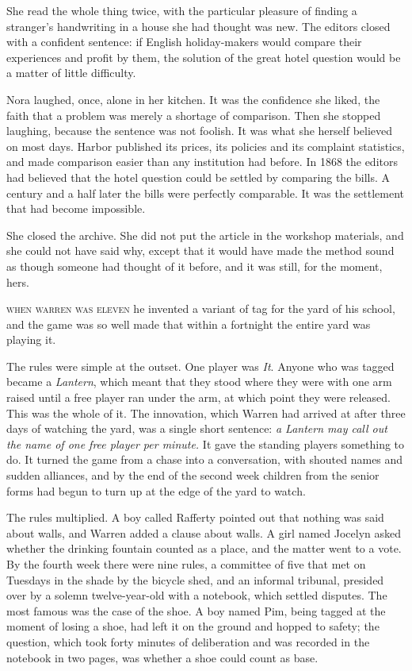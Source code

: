 She read the whole thing twice, with the particular pleasure of finding a stranger's handwriting in a house she had thought was new. The editors closed with a confident sentence: if English holiday-makers would compare their experiences and profit by them, the solution of the great hotel question would be a matter of little difficulty.

Nora laughed, once, alone in her kitchen. It was the confidence she liked, the faith that a problem was merely a shortage of comparison. Then she stopped laughing, because the sentence was not foolish. It was what she herself believed on most days. Harbor published its prices, its policies and its complaint statistics, and made comparison easier than any institution had before. In 1868 the editors had believed that the hotel question could be settled by comparing the bills. A century and a half later the bills were perfectly comparable. It was the settlement that had become impossible.

She closed the archive. She did not put the article in the workshop materials, and she could not have said why, except that it would have made the method sound as though someone had thought of it before, and it was still, for the moment, hers.


\textsc{when warren was eleven} he invented a variant of tag for the yard of his school, and the game was so well made that within a fortnight the entire yard was playing it.

The rules were simple at the outset. One player was \emph{It}. Anyone who was tagged became a \emph{Lantern}, which meant that they stood where they were with one arm raised until a free player ran under the arm, at which point they were released. This was the whole of it. The innovation, which Warren had arrived at after three days of watching the yard, was a single short sentence: \emph{a Lantern may call out the name of one free player per minute.} It gave the standing players something to do. It turned the game from a chase into a conversation, with shouted names and sudden alliances, and by the end of the second week children from the senior forms had begun to turn up at the edge of the yard to watch.

The rules multiplied. A boy called Rafferty pointed out that nothing was said about walls, and Warren added a clause about walls. A girl named Jocelyn asked whether the drinking fountain counted as a place, and the matter went to a vote. By the fourth week there were nine rules, a committee of five that met on Tuesdays in the shade by the bicycle shed, and an informal tribunal, presided over by a solemn twelve-year-old with a notebook, which settled disputes. The most famous was the case of the shoe. A boy named Pim, being tagged at the moment of losing a shoe, had left it on the ground and hopped to safety; the question, which took forty minutes of deliberation and was recorded in the notebook in two pages, was whether a shoe could count as base.

